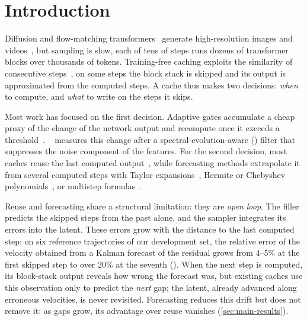 \section{Introduction}
\label{sec:intro}

Diffusion and flow-matching transformers~\cite{peebles2023dit,esser2024scaling} generate high-resolution images
and videos~\cite{blackforestlabs2024flux,kong2024hunyuanvideo,wan2025wan}, but sampling is slow, each of tens of steps
runs dozens of transformer blocks over thousands of tokens. Training-free caching exploits the similarity of
consecutive steps~\cite{ma2024deepcache,selvaraju2024fora,liu2025teacache}, on some steps the block stack is skipped
and its output is approximated from the computed steps. A cache thus makes two decisions: \emph{when} to compute, and
\emph{what} to write on the steps it skips.

Most work has focused on the first decision. Adaptive gates accumulate a cheap proxy of the change of the network
output and recompute once it exceeds a threshold~\cite{liu2025teacache,ma2025magcache,bu2026dicache}.
\seacache~\cite{chung2026seacache} measures this change after a spectral-evolution-aware (\sea) filter that suppresses
the noise component of the features. For the second decision, most caches reuse the last computed
output~\cite{ma2024deepcache,selvaraju2024fora,liu2025teacache,chung2026seacache}, while forecasting methods extrapolate
it from several computed steps with Taylor expansions~\cite{liu2025taylorseer}, Hermite or Chebyshev
polynomials~\cite{feng2026hicache,han2026spectrum}, or multistep formulas~\cite{zheng2026foca}.

Reuse and forecasting share a structural limitation: they are \emph{open loop}. The filler predicts the skipped steps
from the past alone, and the sampler integrates its errors into the latent. These errors grow with the distance to
the last computed step: on six reference trajectories of our development set, the relative error of the velocity
obtained from a Kalman forecast of the residual grows from 4--5\% at the first skipped step to over 20\% at the
seventh (). When the next step is computed, its block-stack output reveals how wrong the forecast was, but
existing caches use this observation only to predict the \emph{next} gap; the latent, already advanced along erroneous
velocities, is never revisited. Forecasting reduces this drift but does not remove it: as gaps grow, its advantage
over reuse vanishes (\cref{sec:main-results}).

